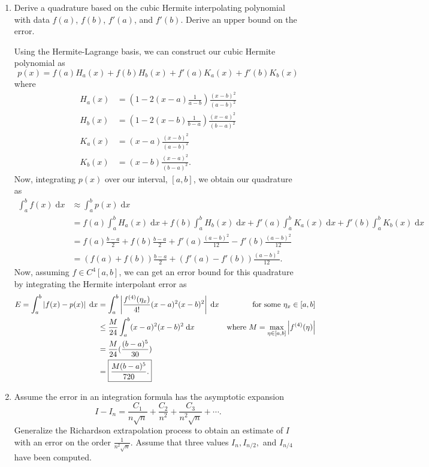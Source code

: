 \documentclass[a4paper,12pt]{article}
\newcommand{\abs}[1]{\left| #1 \right|}
\newcommand{\dd}[1]{\mathrm{d}#1}
\begin{document}
\begin{enumerate}[label = \arabic*.]
	\item 
		Derive a quadrature based on the cubic Hermite interpolating polynomial with data $ f(a) $, $ f(b) $, $ f'(a) $, and $ f'(b) $. Derive an upper bound on the error.
		
		Using the Hermite-Lagrange basis, we can construct our cubic Hermite polynomial as
		\[
			p(x) = f(a) H_a(x) + f(b) H_b(x) + f'(a) K_a(x) + f'(b) K_b(x)
		\]
		where
		\begin{align*}
			H_a(x) &= \left(1 - 2(x - a) \frac{1}{a - b}\right)\frac{(x - b)^2}{(a - b)^2} \\
			H_b(x) &= \left(1 - 2(x - b) \frac{1}{b - a}\right)\frac{(x - a)^2}{(b - a)^2} \\
			K_a(x) &= (x - a)\frac{(x - b)^2}{(a - b)^2} \\
			K_b(x) &= (x - b)\frac{(x - a)^2}{(b - a)^2}.
		\end{align*}
		Now, integrating $ p(x) $ over our interval, $ [a, b] $, we obtain our quadrature as
		\begin{align*}
			\int_a^b f(x) \;\dd x &\approx \int_a^b p(x) \;\dd x \\
			&= f(a) \int_a^b H_a(x) \;\dd x + f(b) \int_a^b H_b(x) \;\dd x + f'(a) \int_a^b K_a(x) \;\dd x + f'(b) \int_a^b K_b(x) \;\dd x \\
			&= f(a) \frac{b - a}{2} + f(b) \frac{b - a}{2} + f'(a) \frac{(a - b)^2}{12} - f'(b) \frac{(a - b)^2}{12} \\
			&= \boxed{(f(a) + f(b)) \frac{b - a}{2} + (f'(a) - f'(b)) \frac{(a - b)^2}{12}.}
		\end{align*}
		Now, assuming $ f \in C^4 [a,b] $, we can get an error bound for this quadrature by integrating the Hermite interpolant error as
		\begin{align*}
			E = \int_{a}^{b} \abs{f(x) - p(x)} \;\dd x &= \int_{a}^{b} \abs{\frac{f^{(4)}(\eta_x)}{4!} (x - a)^2 (x - b)^2} \;\dd x & \text{for some $ \eta_x \in [a, b] $} \\
			&\leq \frac{M}{24} \int_{a}^{b} (x - a)^2 (x - b)^2 \;\dd x & \text{where $ M = \max_{\eta \in [a,b]} \abs{f^{(4)}(\eta)} $} \\
			&= \frac{M}{24} (\frac{(b - a)^5}{30}) \\
			&= \boxed{\frac{M (b - a)^5}{720}.}
		\end{align*}
	
	\newpage
	\item 
		Assume the error in an integration formula has the asymptotic expansion
		\[
			I - I_n = \frac{C_1}{n \sqrt{n}} + \frac{C_2}{n^2} + \frac{C_3}{n^2\sqrt{n}} + \cdots.
		\]
		Generalize the Richardson extrapolation process to obtain an estimate of $ I $ with an error on the order $ \frac{1}{n^2 \sqrt{n}} $. Assume that three values $ I_n, I_{n / 2}, $ and $ I_{n / 4} $ have been computed.
		

\end{enumerate}
\end{document}
